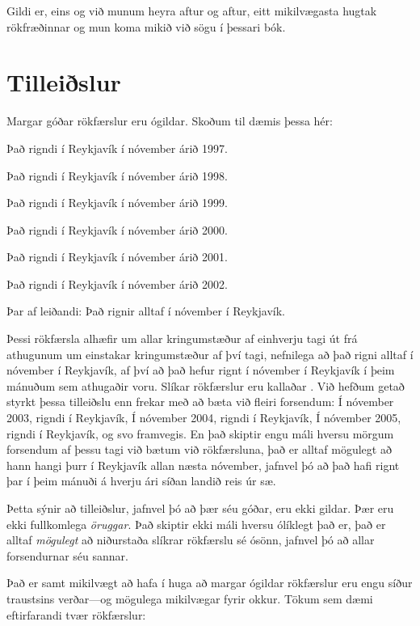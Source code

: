 Gildi er, eins og við munum heyra aftur og aftur, eitt mikilvægasta hugtak rökfræðinnar og mun koma mikið við sögu í þessari bók.

\section{Tilleiðslur}
Margar góðar rökfærslur eru ógildar. Skoðum til dæmis þessa hér:
	\begin{earg}
		\item[] Það rigndi í Reykjavík í nóvember árið 1997.
		\item[] Það rigndi í Reykjavík í nóvember árið 1998.
		\item[] Það rigndi í Reykjavík í nóvember árið 1999.
		\item[] Það rigndi í Reykjavík í nóvember árið 2000.
		\item[] Það rigndi í Reykjavík í nóvember árið 2001.
		\item[]Það rigndi í Reykjavík í nóvember árið 2002.
	\item[Þar af leiðandi:] Það rignir alltaf í nóvember í Reykjavík.
\end{earg}

Þessi rökfærsla alhæfir um allar kringumstæður af einhverju tagi út frá athugunum um einstakar kringumstæður af því tagi, nefnilega að það rigni alltaf í nóvember í Reykjavík, af því að það hefur rignt í nóvember í Reykjavík í þeim mánuðum sem athugaðir voru. Slíkar rökfærslur eru kallaðar . Við hefðum getað styrkt þessa tilleiðslu enn frekar með að bæta við fleiri forsendum: Í nóvember 2003, rigndi í Reykjavík, Í nóvember 2004, rigndi í Reykjavík, Í nóvember 2005, rigndi í Reykjavík, og svo framvegis. En það skiptir engu máli hversu mörgum forsendum af þessu tagi við bætum við rökfærsluna, það er alltaf mögulegt að hann hangi þurr í Reykjavík allan næsta nóvember, jafnvel þó að það hafi rignt þar í þeim mánuði á hverju ári síðan landið reis úr sæ.

Þetta sýnir að tilleiðslur, jafnvel þó að þær séu góðar, eru ekki gildar. Þær eru ekki fullkomlega \emph{öruggar}. Það skiptir ekki máli hversu ólíklegt það er, það er alltaf \emph{mögulegt} að niðurstaða slíkrar rökfærslu sé ósönn, jafnvel þó að allar forsendurnar séu sannar. 

Það er samt mikilvægt að hafa í huga að margar ógildar rökfærslur eru engu síður traustsins verðar---og mögulega mikilvægar fyrir okkur. Tökum sem dæmi eftirfarandi tvær rökfærslur: 

